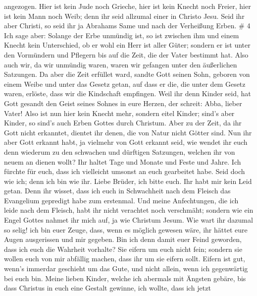 angezogen.  Hier ist kein Jude noch Grieche, hier ist kein
Knecht noch Freier, hier ist kein Mann noch Weib; denn ihr seid allzumal
einer in Christo Jesu.  Seid ihr aber Christi, so seid ihr
ja Abrahams Same und nach der Verheißung Erben. \# 4  Ich
sage aber: Solange der Erbe unmündig ist, so ist zwischen ihm und einem
Knecht kein Unterschied, ob er wohl ein Herr ist aller Güter;
 sondern er ist unter den Vormündern und Pflegern bis auf
die Zeit, die der Vater bestimmt hat.  Also auch wir, da wir
unmündig waren, waren wir gefangen unter den äußerlichen Satzungen.
 Da aber die Zeit erfüllet ward, sandte Gott seinen Sohn,
geboren von einem Weibe und unter das Gesetz getan,  auf
dass er die, die unter dem Gesetz waren, erlöste, dass wir die
Kindschaft empfingen.  Weil ihr denn Kinder seid, hat Gott
gesandt den Geist seines Sohnes in eure Herzen, der schreit: Abba,
lieber Vater!  Also ist nun hier kein Knecht mehr, sondern
eitel Kinder; sind's aber Kinder, so sind's auch Erben Gottes durch
Christum.  Aber zu der Zeit, da ihr Gott nicht erkanntet,
dientet ihr denen, die von Natur nicht Götter sind.  Nun ihr
aber Gott erkannt habt, ja vielmehr von Gott erkannt seid, wie wendet
ihr euch denn wiederum zu den schwachen und dürftigen Satzungen, welchen
ihr von neuem an dienen wollt?  Ihr haltet Tage und Monate
und Feste und Jahre.  Ich fürchte für euch, dass ich
vielleicht umsonst an euch gearbeitet habe.  Seid doch wie
ich; denn ich bin wie ihr. Liebe Brüder, ich bitte euch. Ihr habt mir
kein Leid getan.  Denn ihr wisset, dass ich euch in
Schwachheit nach dem Fleisch das Evangelium gepredigt habe zum
erstenmal.  Und meine Anfechtungen, die ich leide nach dem
Fleisch, habt ihr nicht verachtet noch verschmäht; sondern wie ein Engel
Gottes nahmet ihr mich auf, ja wie Christum Jesum.  Wie
wart ihr dazumal so selig! ich bin euer Zeuge, dass, wenn es möglich
gewesen wäre, ihr hättet eure Augen ausgerissen und mir gegeben.
 Bin ich denn damit euer Feind geworden, dass ich euch die
Wahrheit vorhalte?  Sie eifern um euch nicht fein; sondern
sie wollen euch von mir abfällig machen, dass ihr um sie eifern sollt.
 Eifern ist gut, wenn's immerdar geschieht um das Gute, und
nicht allein, wenn ich gegenwärtig bei euch bin.  Meine
lieben Kinder, welche ich abermals mit Ängsten gebäre, bis dass Christus
in euch eine Gestalt gewinne,  ich wollte, dass ich jetzt
